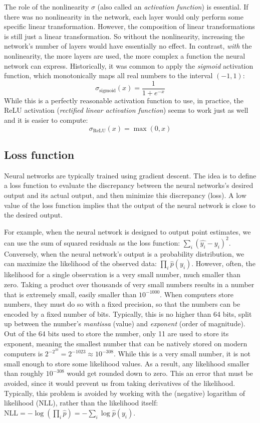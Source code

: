 \documentclass[12pt]{article}
\begin{document}
The role of the nonlinearity $\sigma$ (also called an \textit{activation function}) is essential. If there was no nonlinearity in the network, each layer would only perform some specific linear transformation. However, the composition of linear transformations is still just a linear transformation. So without the nonlinearity, increasing the network's number of layers would have essentially no effect. In contrast, \textit{with} the nonlinearity, the more layers are used, the more complex a function the neural network can express. Historically, it was common to apply the \textit{sigmoid} activation function, which monotonically maps all real numbers to the interval $(-1, 1)$:
$$
\sigma_{\textrm{sigmoid}}(x) = \frac{1}{1 + e^{-x}}
$$
While this is a perfectly reasonable activation function to use, in practice, the ReLU activation (\textit{rectified linear activation function}) seems to work just as well and it is easier to compute:
$$
\sigma_{\textrm{ReLU}}(x) = \max(0, x)
$$

\subsection{Loss function}

Neural networks are typically trained using gradient descent. The idea is to define a loss function to evaluate the discrepancy between the neural networks's desired output and its actual output, and then minimize this discrepancy (loss). A low value of the loss function implies that the output of the neural network is close to the desired output.

For example, when the neural network is designed to output point estimates, we can use the sum of squared residuals as the loss function: $\sum_i (\hat{y_i} - y_i)^2$. Conversely, when the neural network's output is a probability distribution, we can maximize the likelihood of the observed data: $\prod_i \hat{p}(y_i)$. However, often, the likelihood for a single observation is a very small number, much smaller than zero. Taking a product over thousands of very small numbers results in a number that is extremely small, easily smaller than $10^{-1000}$. When computers store numbers, they must do so with a fixed precision, so that the numbers can be encoded by a fixed number of bits. Typically, this is no higher than 64 bits, split up between the number's \textit{mantissa} (value) and \textit{exponent} (order of magnitude). Out of the 64 bits used to store the number, only 11 are used to store its exponent, meaning the smallest number that can be natively stored on modern computers is $2^{-2^{10}} = 2^{-1023} \approx 10^{-308}$. While this is a very small number, it is not small enough to store some likelihood values. As a result, any likelihood smaller than roughly $10^{-308}$ would get rounded down to zero. This an error that must be avoided, since it would prevent us from taking derivatives of the likelihood. Typically, this problem is avoided by working with the (negative) logarithm of likelihood ($\textrm{NLL}$), rather than the likelihood itself: $\textrm{NLL} = -\log(\prod_i \hat{p}) = -\sum_i \log\hat{p}(y_i)$.
\end{document}
